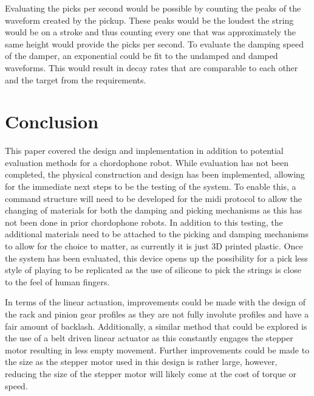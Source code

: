 \documentclass[12pt, a4paper, onecolumn]{IEEEtran}
\begin{document}
		Evaluating the picks per second would be possible by counting the peaks of the waveform created by the pickup.
		These peaks would be the loudest the string would be on a stroke and thus counting every one that was approximately the same height would provide the picks per second.
		To evaluate the damping speed of the damper, an exponential could be fit to the undamped and damped waveforms. This would result in decay rates that are comparable to each other and the target from the requirements.

    \section{Conclusion}
		This paper covered the design and implementation in addition to potential evaluation methods for a chordophone robot.
		While evaluation has not been completed, the physical construction and design has been implemented, allowing for the immediate next steps to be the testing of the system.
		To enable this, a command structure will need to be developed for the midi protocol to allow the changing of materials for both the damping and picking mechanisms as this has not been done in prior chordophone robots.
		In addition to this testing, the additional materials need to be attached to the picking and damping mechanisms to allow for the choice to matter, as currently it is just 3D printed plastic.
		Once the system has been evaluated, this device opens up the possibility for a pick less style of playing to be replicated as the use of silicone to pick the strings is close to the feel of human fingers.

		In terms of the linear actuation, improvements could be made with the design of the rack and pinion gear profiles as they are not fully involute profiles and have a fair amount of backlash.
		Additionally, a similar method that could be explored is the use of a belt driven linear actuator as this constantly engages the stepper motor resulting in less empty movement.
		Further improvements could be made to the size as the stepper motor used in this design is rather large, however, reducing the size of the stepper motor will likely come at the cost of torque or speed.

    \printbibliography
\end{document}

